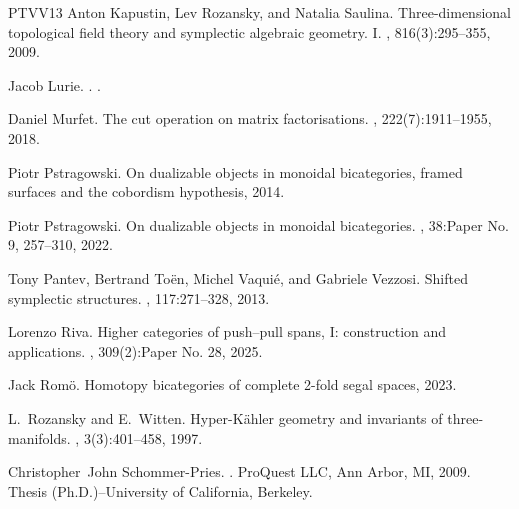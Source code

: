 \documentclass{amsart}
\theoremstyle{definition}
\theoremstyle{theorem}
\theoremstyle{theorem}
\numberwithin{equation}{subsection}
\begin{document}
\begin{thebibliography}{PTVV13}
Anton Kapustin, Lev Rozansky, and Natalia Saulina.
\newblock Three-dimensional topological field theory and symplectic algebraic geometry. {I}.
, 816(3):295--355, 2009.

Jacob Lurie.
.
.

Daniel Murfet.
\newblock The cut operation on matrix factorisations.
, 222(7):1911--1955, 2018.

Piotr Pstragowski.
\newblock On dualizable objects in monoidal bicategories, framed surfaces and the cobordism hypothesis, 2014.

Piotr Pstragowski.
\newblock On dualizable objects in monoidal bicategories.
, 38:Paper No. 9, 257--310, 2022.

Tony Pantev, Bertrand To\"{e}n, Michel Vaqui\'{e}, and Gabriele Vezzosi.
\newblock Shifted symplectic structures.
, 117:271--328, 2013.

Lorenzo Riva.
\newblock Higher categories of push--pull spans, {I}: construction and applications.
, 309(2):Paper No. 28, 2025.

Jack Rom\"o.
\newblock Homotopy bicategories of complete 2-fold segal spaces, 2023.

L.~Rozansky and E.~Witten.
\newblock Hyper-{K}\"ahler geometry and invariants of three-manifolds.
, 3(3):401--458, 1997.

Christopher~John Schommer-Pries.
.
\newblock ProQuest LLC, Ann Arbor, MI, 2009.
\newblock Thesis (Ph.D.)--University of California, Berkeley.

\end{thebibliography}
\end{document}
